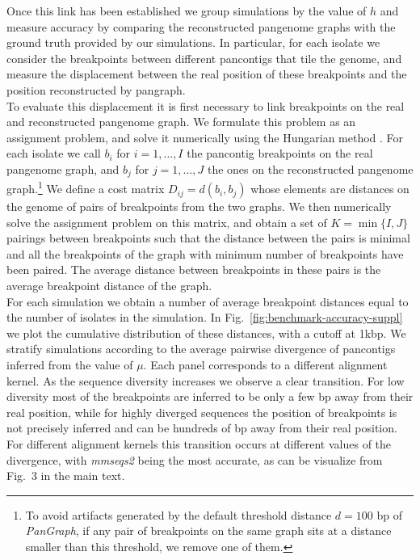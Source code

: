 \documentclass[aps,rmp,reprint,superscriptaddress,notitlepage,10pt,onecolumn]{revtex4-1}
\begin{document}
Once this link has been established we group simulations by the value of $h$ and measure accuracy by comparing the reconstructed pangenome graphs with the ground truth provided by our simulations. In particular, for each isolate we consider the breakpoints between different pancontigs that tile the genome, and measure the displacement between the real position of these breakpoints and the position reconstructed by pangraph.\\
To evaluate this displacement it is first necessary to link breakpoints on the real and reconstructed pangenome graph. We formulate this problem as an assignment problem, and solve it numerically using the Hungarian method \cite{kuhn1955hungarian}. For each isolate we call $b_i$ for $i=1,\ldots,I$ the pancontig breakpoints on the real pangenome graph, and $b_j$ for $j=1,\ldots,J$ the ones on the reconstructed pangenome graph.\footnote{To avoid artifacts generated by the default threshold distance $d=100$ bp of \textit{PanGraph}, if any pair of breakpoints on the same graph sits at a distance smaller than this threshold, we remove one of them.} We define a cost matrix $D_{ij} = d(b_i,b_j)$ whose elements are distances on the genome of pairs of breakpoints from the two graphs. We then numerically solve the assignment problem on this matrix, and obtain a set of $K = \min\{ I,J \}$ pairings between breakpoints such that the distance between the pairs is minimal and all the breakpoints of the graph with minimum number of breakpoints have been paired. The average distance between breakpoints in these pairs is the average breakpoint distance of the graph.\\
For each simulation we obtain a number of average breakpoint distances equal to the number of isolates in the simulation. In Fig.~\ref{fig:benchmark-accuracy-suppl} we plot the cumulative distribution of these distances, with a cutoff at 1kbp. We stratify simulations according to the average pairwise divergence of pancontigs inferred from the value of $\mu$. Each panel corresponds to a different alignment kernel. As the sequence diversity increases we observe a clear transition. For low diversity most of the breakpoints are inferred to be only a few bp away from their real position, while for highly diverged sequences the position of breakpoints is not precisely inferred and can be hundreds of bp away from their real position. For different alignment kernels this transition occurs at different values of the divergence, with \textit{mmseqs2} being the most accurate, as can be visualize from Fig.~3 in the main text.
\end{document}
